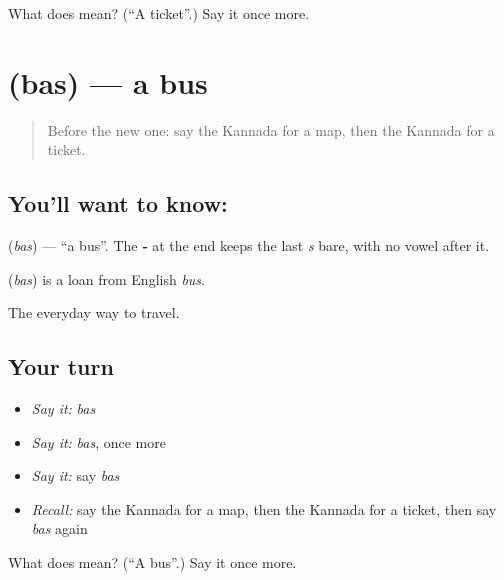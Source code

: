 \begin{tcolorbox}[breakable,colback=teal!4,colframe=teal!35!black,title={Before you move on}]
What does  mean? (\textquotedblleft{}A ticket\textquotedblright{}.) Say it once more.
\end{tcolorbox}
\section[\texorpdfstring{\kn{ಬಸ್} (bas)}{ಬಸ್ (bas)}]{ (bas) — a bus}

\label{lesson:KA-C100-bus}



\begin{quote}
Before the new one: say the Kannada for a map, then the Kannada for a ticket.
\end{quote}

\subsection*{You'll want to know: }
\textbf{} (\emph{bas}) — \textquotedblleft{}a bus\textquotedblright{}. The \textbf{‑} at the end keeps the last \emph{s} bare, with no vowel after it.

\begin{cousinweb}
\textbf{} (\emph{bas}) is a loan from English \emph{bus}.
\end{cousinweb}

\begin{grammarlens}[title={What you've built}]
The everyday way to travel.
\end{grammarlens}

\subsection*{Your turn}
\begin{itemize}
\raggedright
  \item \emph{Say it:} \emph{bas}
  \item \emph{Say it:} \emph{bas}, once more
  \item \emph{Say it:} say \emph{bas}
  \item \emph{Recall:} say the Kannada for a map, then the Kannada for a ticket, then say \emph{bas} again
\end{itemize}

\begin{tcolorbox}[breakable,colback=teal!4,colframe=teal!35!black,title={Before you move on}]
What does  mean? (\textquotedblleft{}A bus\textquotedblright{}.) Say it once more.
\end{tcolorbox}
